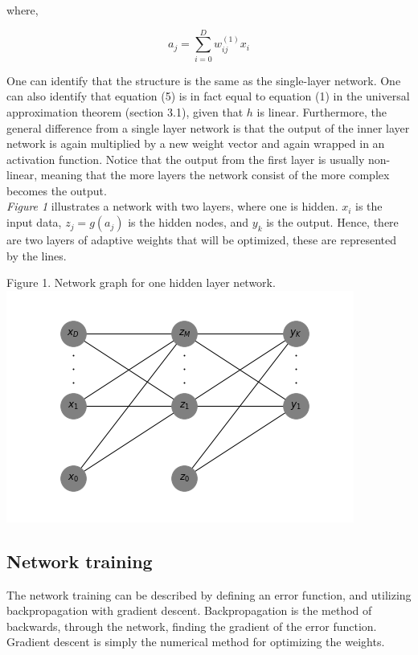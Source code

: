 \documentclass[12pt, letterpaper]{amsart}%
\begin{document}
where,

\begin{equation}
a_j = \sum_{i=0}^D w_{ij}^{(1)} x_i
\end{equation}

One can identify that the structure is the same as the single-layer network. One can also identify that equation (5) is in fact equal to equation (1) in the universal approximation theorem (section 3.1), given that $h$ is linear. Furthermore, the general difference from a single layer network is that the output of the inner layer network is again multiplied by a new weight vector and again wrapped in an activation function. Notice that the output from the first layer is usually non-linear, meaning that the more layers the network consist of the more complex becomes the output.
\\

\textit{Figure 1} illustrates a network with two layers, where one is hidden. $x_i$ is the input data, $z_j = g(a_j)$ is the hidden nodes, and $y_k$ is the output. Hence, there are two layers of adaptive weights that will be optimized, these are represented by the lines.

\begin{center}{Figure 1. Network graph for one hidden layer network.}
  \includegraphics[scale=0.5]{Network.png}
\end{center}

\subsection{Network training}
The network training can be described by defining an error function, and utilizing backpropagation with gradient descent. Backpropagation is the method of backwards, through the network, finding the gradient of the error function. Gradient descent is simply the numerical method for optimizing the weights.
\end{document}
